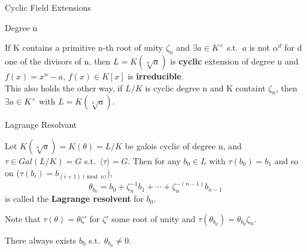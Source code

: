 \documentclass[12pt, letterpaper]{article}
\begin{document}
\begin{section}{Cyclic Field Extensions}
  \begin{subsection}{Degree n}

    If K contains a primitive n-th root of unity \(\zeta_{n}\) and
    \(\exists a \in K^{\times}\) s.t.\ \(a\) is not \(\alpha^{d}\) for d one of the
    divisors of n, then \(L = K(\sqrt[n]{a})\) is \textbf{cyclic} extension  of
    degree n and \(f(x) = x^{n} - a\), \(f(x) \in K[x]\) is
    \textbf{irreducible}. \\
    This also holds the other way, if \(L / K\) is cyclic degree n and K
    containt \(\zeta_{n}\), then \(\exists a \in K^{\times}\) with \(L =
    K(\sqrt[n]{a})\).

  \end{subsection}

  \begin{subsection}{Lagrange Resolvant}

    Let \(K(\sqrt[n]{a}) = K(\theta) = L / K\) be galois cyclic of degree n, and
    \(\tau \in Gal(L / K) = G\) s.t.\ \(\langle \tau \rangle = G\). Then for any
    \(b_{0} \in L\) with \(\tau(b_{0}) = b_{1}\) and so on
    (\(\tau(b_{i}) = b_{(i + 1) \pmod{n}}\)),
    \[\theta_{b_{0}} = b_{0} + \zeta^{-1}_{n} b_{1} + \cdots +
      \zeta^{-(n - 1)}_{n} b_{n - 1}\] is called the \textbf{Lagrange resolvent}
    for \(b_{0}\).

    Note that \(\tau(\theta) = \theta \zeta'\) for \(\zeta'\) some root of unity
    and \(\tau(\theta_{b_{0}}) = \theta_{b_{0}} \zeta_{n}\).

    There always exists \(b_{0}\) s.t.\ \(\theta_{b_{0}} \neq 0\).

  \end{subsection}

\end{section}
\end{document}
